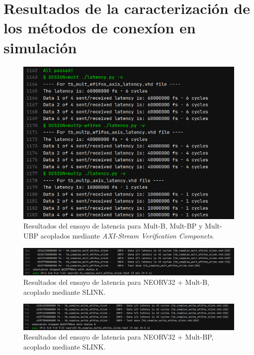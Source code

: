 
\chapter{Resultados de la caracterización de los métodos de conexíon en simulación} %

\label{Resultados-Sim-caract} 

\begin{figure}[H]
    \centering
    \includegraphics[width=14cm]{Figuras/result/lat1.png}
    \caption{Resultados del ensayo de latencia para Mult-B, Mult-BP y Mult-UBP acoplados mediante \textit{AXI-Stream Verification Componets}.}
    \label{fig:lat1}
\end{figure}

\begin{figure}[H]
    \centering
    \includegraphics[width=14cm]{Figuras/result/lat2.png}
    \caption{Resultados del ensayo de latencia para NEORV32 + Mult-B, acoplado mediante SLINK.}
    \label{fig:lat2}
\end{figure}

\begin{figure}[H]
    \centering
    \includegraphics[width=14cm]{Figuras/result/lat3.png}
    \caption{Resultados del ensayo de latencia para NEORV32 + Mult-BP, acoplado mediante SLINK.}
    \label{fig:lat3}
\end{figure}

